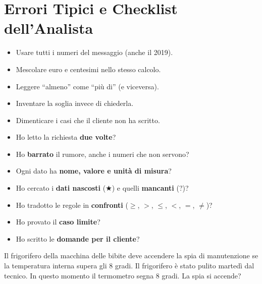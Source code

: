 \section{Errori Tipici e Checklist dell'Analista}

\begin{attenzione}
\begin{itemize}
  \item Usare tutti i numeri del messaggio (anche il 2019).
  \item Mescolare euro e centesimi nello stesso calcolo.
  \item Leggere ``almeno'' come ``più di'' (e viceversa).
  \item Inventare la soglia invece di chiederla.
  \item Dimenticare i casi che il cliente non ha scritto.
\end{itemize}
\end{attenzione}

\begin{consiglio}
\begin{itemize}
  \item[$\square$] Ho letto la richiesta \textbf{due volte}?
  \item[$\square$] Ho \textbf{barrato} il rumore, anche i numeri che non servono?
  \item[$\square$] Ogni dato ha \textbf{nome, valore e unità di misura}?
  \item[$\square$] Ho cercato i \textbf{dati nascosti} ($\bigstar$) e quelli \textbf{mancanti} (?)?
  \item[$\square$] Ho tradotto le regole in \textbf{confronti} ($\geq$, $>$, $\leq$, $<$, $=$, $\neq$)?
  \item[$\square$] Ho provato il \textbf{caso limite}?
  \item[$\square$] Ho scritto le \textbf{domande per il cliente}?
\end{itemize}
\end{consiglio}

\begin{esercizio}
Il frigorifero della macchina delle bibite deve accendere la spia di manutenzione se la temperatura interna supera gli 8 gradi. Il frigorifero è stato pulito martedì dal tecnico. In questo momento il termometro segna 8 gradi. La spia si accende?
\end{esercizio}

